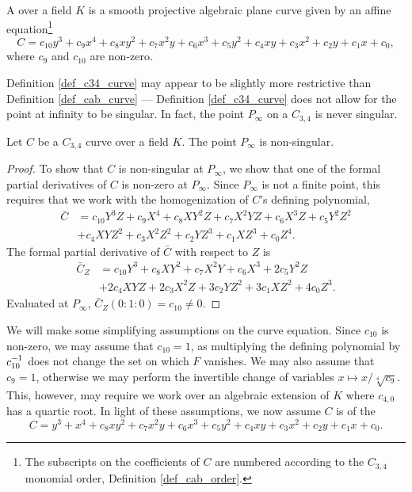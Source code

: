 \begin{definition}
  \label{def_c34_curve}
  A  over a field $K$
  is a smooth projective algebraic plane curve
  given by an affine equation\footnote{
  The subscripts on the coefficients of $C$ are numbered according to the $C_{3,4}$ monomial order,
  Definition \ref{def_cab_order}.}
  \[ C = c_{10}y^3 + c_9x^4 + c_8xy^2 + c_7x^2y + c_6x^3 + c_5y^2 + c_4xy + c_3x^2 + c_2y + c_1x + c_0, \]
  where $c_{9}$ and $c_{10}$ are non-zero.
\end{definition}

Definition \ref{def_c34_curve} may appear to be slightly more restrictive than Definition \ref{def_cab_curve} ---
Definition \ref{def_c34_curve} does not allow for the point at infinity to be singular.
In fact, the point $P_\infty$ on a $C_{3,4}$ is never singular.

\begin{proposition}
  Let $C$ be a $C_{3,4}$ curve over a field $K$.
  The point $P_\infty$ is non-singular.
\end{proposition}
\begin{proof}
  To show that $C$ is non-singular at $P_\infty$,
  we show that one of the formal partial derivatives of $C$ is non-zero at $P_\infty$.
  Since $P_\infty$ is not a finite point,
  this requires that we work with the homogenization of $C$'s defining polynomial,
  \begin{align*}
    \bar C &= c_{10}Y^3Z + c_9X^4 + c_8XY^2Z + c_7X^2YZ + c_6X^3Z + c_5Y^2Z^2 \\ 
           &+ c_4XYZ^2 + c_3X^2Z^2 + c_2YZ^3 + c_1XZ^3 + c_0Z^4.
  \end{align*}
  The formal partial derivative of $\bar C$ with respect to $Z$ is
  \begin{align*}
    \bar C_Z &= c_{10}Y^3 + c_8XY^2 + c_7X^2Y + c_6X^3 + 2c_5Y^2Z \\
             &+ 2c_4XYZ + 2c_3X^2Z + 3c_2YZ^2 + 3c_1XZ^2 + 4c_0Z^3.
  \end{align*}
  Evaluated at $P_\infty$, $\bar C_Z(0 : 1 : 0) = c_{10} \neq 0$.
\end{proof}

We will make some simplifying assumptions on the curve equation.
Since $c_{10}$ is non-zero, we may assume that $c_{10} = 1$,
as multiplying the defining polynomial by $c_{10}^{-1}$ does not change the set on which $F$ vanishes.
We may also assume that $c_9 = 1$,
otherwise we may perform the invertible change of variables $x \mapsto x / \sqrt[4]{c_{9}}$.
This, however, may require we work over an algebraic extension of $K$ where $c_{4,0}$ has a quartic root.
In light of these assumptions, we now assume $C$ is of the 
\begin{equation}
  \label{eq_c34}
  C = y^3 + x^4 + c_8xy^2 + c_7x^2y + c_6x^3 + c_5y^2 + c_4xy + c_3x^2 + c_2y + c_1x + c_0.
\end{equation}

